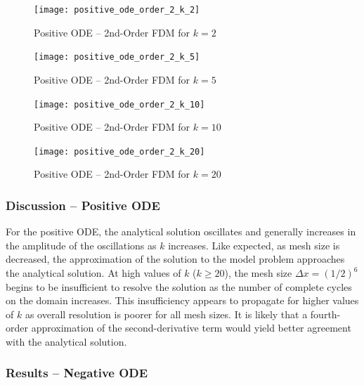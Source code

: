 \documentclass[10pt, reqno]{article}		%
\numberwithin{equation}{section}
\begin{document}
\begin{figure}[H]
	\begin{center}
		\texttt{[image: positive\_ode\_order\_2\_k\_2]}
		\caption{Positive ODE -- 2nd-Order FDM for $k = 2$}
	\end{center}
\end{figure}

\vfill

\begin{figure}[H]
	\begin{center}
		\texttt{[image: positive\_ode\_order\_2\_k\_5]}
		\caption{Positive ODE -- 2nd-Order FDM for $k = 5$}
	\end{center}
\end{figure}

\begin{figure}[H]
	\begin{center}
		\texttt{[image: positive\_ode\_order\_2\_k\_10]}
		\caption{Positive ODE -- 2nd-Order FDM for $k = 10$}
	\end{center}
\end{figure}

\vfill

\begin{figure}[H]
	\begin{center}
		\texttt{[image: positive\_ode\_order\_2\_k\_20]}
		\caption{Positive ODE -- 2nd-Order FDM for $k = 20$}
	\end{center}
\end{figure}

\subsubsection{Discussion -- Positive ODE}

For the positive ODE, the analytical solution oscillates and generally increases in the amplitude of the oscillations as $k$ increases. Like expected, as mesh size is decreased, the approximation of the solution to the model problem approaches the analytical solution. At high values of $k$ ($k \ge 20$), the mesh size $\Delta x = (1/2)^6$ begins to be insufficient to resolve the solution as the number of complete cycles on the domain increases. This insufficiency appears to propagate for higher values of $k$ as overall resolution is poorer for all mesh sizes. It is likely that a fourth-order approximation of the second-derivative term would yield better agreement with the analytical solution.

\subsubsection{Results -- Negative ODE}
\end{document}
